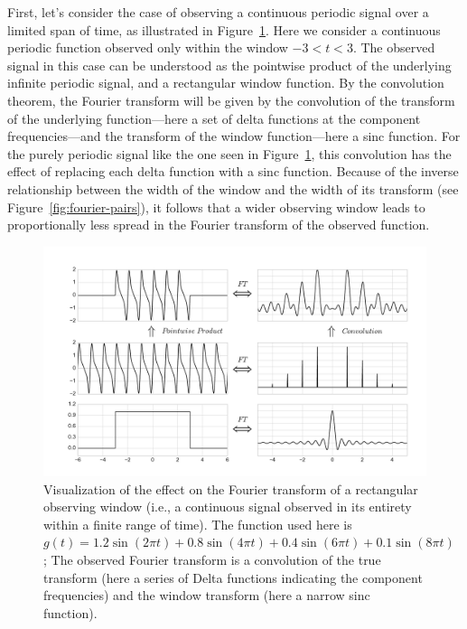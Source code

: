 \documentclass[preprint]{aastex}
\newcommand{\Fig}[1]{Figure~\ref{fig:#1}}
\newcommand{\fig}[1]{Figure~\ref{fig:#1}}
\newcommand{\figlabel}[1]{\label{fig:#1}}
\begin{document}
First, let's consider the case of observing a continuous periodic signal over
a limited span of time, as illustrated in \Fig{rectangular-window}.
Here we consider a continuous periodic function observed only within the
window $-3<t<3$.
The observed signal in this case can be understood as the pointwise product of
the underlying infinite periodic signal, and a rectangular window function.
By the convolution theorem, the Fourier transform will be given by the
convolution of the transform of the underlying function---here a set of
delta functions at the component frequencies---and the transform of the window
function---here a sinc function.
For the purely periodic signal like the one seen in \fig{rectangular-window},
this convolution has the effect of replacing each delta function with a
sinc function.
Because of the inverse relationship between the width of the window and the
width of its transform (see \Fig{fourier-pairs}), it follows that a wider
observing window leads to proportionally less spread in the Fourier
transform of the observed function.

\begin{figure}[ht]
  \centering
  \includegraphics[width=\textwidth]{fig06_Rectangular_Window}
  \caption{Visualization of the effect on the Fourier transform of a
    rectangular observing window (i.e., a continuous signal observed in its
    entirety within a finite range of time). The function used here is
    $g(t) = 1.2\sin(2\pi t) + 0.8\sin(4\pi t) + 0.4\sin(6\pi t) + 0.1\sin(8\pi t)$; The observed Fourier
    transform is a convolution of the true transform (here a series of Delta
    functions indicating the component frequencies) and the window transform
    (here a narrow sinc function).
    \figlabel{rectangular-window}}
\end{figure}
\end{document}
